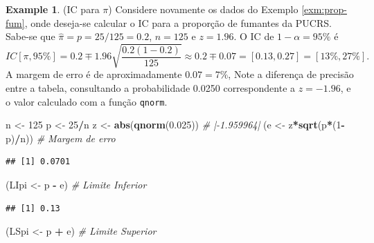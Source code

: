 \documentclass[
]{book}
\newenvironment{Shaded}{\begin{snugshade}}{\end{snugshade}}
\newcommand{\CommentTok}[1]{\textcolor[rgb]{0.56,0.35,0.01}{\textit{#1}}}
\newcommand{\DecValTok}[1]{\textcolor[rgb]{0.00,0.00,0.81}{#1}}
\newcommand{\FloatTok}[1]{\textcolor[rgb]{0.00,0.00,0.81}{#1}}
\newcommand{\KeywordTok}[1]{\textcolor[rgb]{0.13,0.29,0.53}{\textbf{#1}}}
\newcommand{\NormalTok}[1]{#1}
\newcommand{\OperatorTok}[1]{\textcolor[rgb]{0.81,0.36,0.00}{\textbf{#1}}}
\newcommand{\StringTok}[1]{\textcolor[rgb]{0.31,0.60,0.02}{#1}}
\theoremstyle{definition}
\theoremstyle{definition}
\newtheorem{example}{Example}[chapter]
\theoremstyle{definition}
\theoremstyle{remark}
\begin{document}
\begin{example}
\protect\hypertarget{exm:ic-prop}{}{\label{exm:ic-prop} }(IC para \(\pi\)) Considere novamente os dados do Exemplo \ref{exm:prop-fum}, onde deseja-se calcular o IC para a proporção de fumantes da PUCRS. Sabe-se que \(\hat{\pi} = p = 25/125 = 0.2\), \(n=125\) e \(z=1.96\). O IC de \(1-\alpha=95\%\) é \[ IC \left[ \pi, 95\% \right] = 0.2 \mp 1.96 \sqrt{\dfrac{0.2 \left(  1-0.2 \right)  }{125}} \approx 0.2 \mp 0.07 = \left[ 0.13, 0.27 \right] = \left[ 13\%, 27\% \right]. \] A margem de erro é de aproximadamente \(0.07 = 7\%\), Note a diferença de precisão entre a tabela, consultando a probabilidade 0.0250 correspondente a \(z=-1.96\), e o valor calculado com a função \texttt{qnorm}.
\end{example}

\begin{Shaded}
\begin{Highlighting}[]
\NormalTok{n \textless{}{-}}\StringTok{ }\DecValTok{125}
\NormalTok{p \textless{}{-}}\StringTok{ }\DecValTok{25}\OperatorTok{/}\NormalTok{n}
\NormalTok{z \textless{}{-}}\StringTok{ }\KeywordTok{abs}\NormalTok{(}\KeywordTok{qnorm}\NormalTok{(}\FloatTok{0.025}\NormalTok{))          }\CommentTok{\# |{-}1.959964|}
\NormalTok{(e \textless{}{-}}\StringTok{ }\NormalTok{z}\OperatorTok{*}\KeywordTok{sqrt}\NormalTok{(p}\OperatorTok{*}\NormalTok{(}\DecValTok{1}\OperatorTok{{-}}\NormalTok{p)}\OperatorTok{/}\NormalTok{n))        }\CommentTok{\# Margem de erro}
\end{Highlighting}
\end{Shaded}

\begin{verbatim}
## [1] 0.0701
\end{verbatim}

\begin{Shaded}
\begin{Highlighting}[]
\NormalTok{(LIpi \textless{}{-}}\StringTok{ }\NormalTok{p }\OperatorTok{{-}}\StringTok{ }\NormalTok{e)                 }\CommentTok{\# Limite Inferior}
\end{Highlighting}
\end{Shaded}

\begin{verbatim}
## [1] 0.13
\end{verbatim}

\begin{Shaded}
\begin{Highlighting}[]
\NormalTok{(LSpi \textless{}{-}}\StringTok{ }\NormalTok{p }\OperatorTok{+}\StringTok{ }\NormalTok{e)                 }\CommentTok{\# Limite Superior}
\end{Highlighting}
\end{Shaded}
\end{document}

